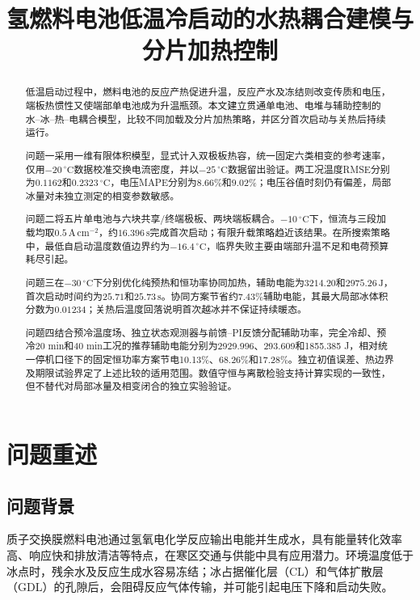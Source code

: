 \documentclass[bwprint]{gmcmthesis}
\title{氢燃料电池低温冷启动的水热耦合建模与分片加热控制}
\numberwithin{equation}{section}
\numberwithin{figure}{section}
\begin{document}
 \maketitle
 \begin{abstract}
低温启动过程中，燃料电池的反应产热促进升温，反应产水及冻结则改变传质和电压，端板热惯性又使端部单电池成为升温瓶颈。本文建立贯通单电池、电堆与辅助控制的水--冰--热--电耦合模型，比较不同加载及分片加热策略，并区分首次启动与关热后持续运行。

问题一采用一维有限体积模型，显式计入双极板热容，统一固定六类相变的参考速率，仅用$-20\,^\circ\mathrm C$数据校准交换电流密度，并以$-25\,^\circ\mathrm C$数据留出验证。两工况温度RMSE分别为$0.1162$和$0.2323\,^\circ\mathrm C$，电压MAPE分别为$8.66\%$和$9.02\%$；电压谷值时刻仍有偏差，局部冰量对未独立测定的相变参数敏感。

问题二将五片单电池与六块共享/终端极板、两块端板耦合。$-10\,^\circ\mathrm C$下，恒流与三段加载均取$0.5\,\mathrm{A\,cm^{-2}}$，约$16.396\,\mathrm s$完成首次启动；有限升载策略趋近该结果。在所搜索策略中，最低自启动温度数值边界约为$-16.4\,^\circ\mathrm C$，临界失败主要由端部升温不足和电荷预算耗尽引起。

问题三在$-30\,^\circ\mathrm C$下分别优化纯预热和恒功率协同加热，辅助电能为$3214.20$和$2975.26\,\mathrm J$，首次启动时间约为$25.71$和$25.73\,\mathrm s$。协同方案节省约$7.43\%$辅助电能，其最大局部冰体积分数为$0.01234$；关热后温度回落说明首次越冰并不保证持续暖态。

问题四结合预冷温度场、独立状态观测器与前馈--PI反馈分配辅助功率，完全冷却、预冷20 min和40 min工况的推荐辅助电能分别为2929.996、293.609和1855.385 J，相对统一停机口径下的固定恒功率方案节电10.13\%、68.26\%和17.28\%。独立初值误差、热边界及期限试验界定了上述比较的适用范围。数值守恒与离散检验支持计算实现的一致性，但不替代对局部冰量及相变闭合的独立实验验证。
\end{abstract}


\setcounter{tocdepth}{2}
\tableofcontents

\clearpage

\section{问题重述}
\subsection{问题背景}
质子交换膜燃料电池通过氢氧电化学反应输出电能并生成水，具有能量转化效率高、响应快和排放清洁等特点，在寒区交通与供能中具有应用潜力。环境温度低于冰点时，残余水及反应生成水容易冻结；冰占据催化层（CL）和气体扩散层（GDL）的孔隙后，会阻碍反应气体传输，并可能引起电压下降和启动失败。
\end{document}
